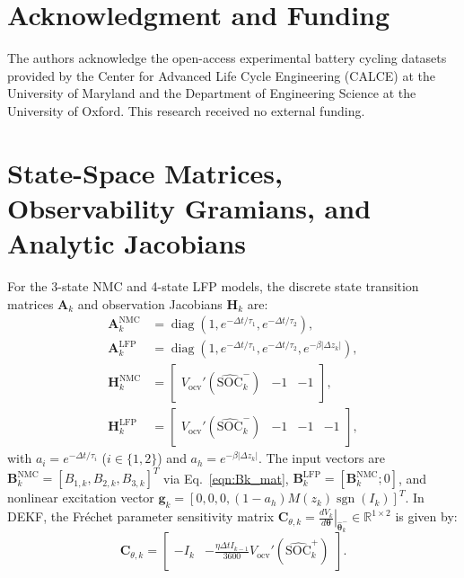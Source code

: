 \documentclass[balance,nocopyright,upint,varvw,hyphenate,barcolor=NavyBlue,nolists]{asmejour}
\begin{document}
\section*{Acknowledgment and Funding}
The authors acknowledge the open-access experimental battery cycling datasets provided by the Center for Advanced Life Cycle Engineering (CALCE) at the University of Maryland and the Department of Engineering Science at the University of Oxford. This research received no external funding.

\appendix
\section{State-Space Matrices, Observability Gramians, and Analytic Jacobians\label{app:jacobians}}
For the 3-state NMC and 4-state LFP models, the discrete state transition matrices $\mathbf{A}_k$ and observation Jacobians $\mathbf{H}_k$ are:
\begin{align}
\mathbf{A}_k^{\text{NMC}} &= \operatorname{diag}\left(1, e^{-\Delta t/\tau_1}, e^{-\Delta t/\tau_2}\right), \label{eqn:app_A_nmc}\\
\mathbf{A}_k^{\text{LFP}} &= \operatorname{diag}\left(1, e^{-\Delta t/\tau_1}, e^{-\Delta t/\tau_2}, e^{-\beta|\Delta z_k|}\right), \label{eqn:app_A_lfp}\\
\mathbf{H}_k^{\text{NMC}} &= \begin{bmatrix} V_{\text{ocv}}'(\widehat{\text{SOC}}_k^-) & -1 & -1 \end{bmatrix}, \label{eqn:app_H_nmc}\\
\mathbf{H}_k^{\text{LFP}} &= \begin{bmatrix} V_{\text{ocv}}'(\widehat{\text{SOC}}_k^-) & -1 & -1 & -1 \end{bmatrix}, \label{eqn:app_H_lfp}
\end{align}
with $a_i = e^{-\Delta t/\tau_i}$ ($i \in \{1, 2\}$) and $a_h = e^{-\beta|\Delta z_k|}$. The input vectors are $\mathbf{B}_k^{\text{NMC}} = [B_{1,k}, B_{2,k}, B_{3,k}]^T$ via Eq.~\eqref{eqn:Bk_mat}, $\mathbf{B}_k^{\text{LFP}} = [\mathbf{B}_k^{\text{NMC}}; 0]$, and nonlinear excitation vector $\mathbf{g}_k = [0, 0, 0, (1 - a_h) M(z_k) \operatorname{sgn}(I_k)]^T$. In DEKF, the Fréchet parameter sensitivity matrix $\mathbf{C}_{\theta,k} = \left. \frac{d V_k}{d \boldsymbol{\theta}} \right|_{\hat{\boldsymbol{\theta}}_k^-} \in \mathbb{R}^{1 \times 2}$ is given by:
\begin{equation}\label{eqn:app_C_theta}
\mathbf{C}_{\theta,k} = \begin{bmatrix} -I_k & -\frac{\eta \Delta t I_{k-1}}{3600} V_{\text{ocv}}'(\widehat{\text{SOC}}_k^+) \end{bmatrix}.
\end{equation}
\end{document}
